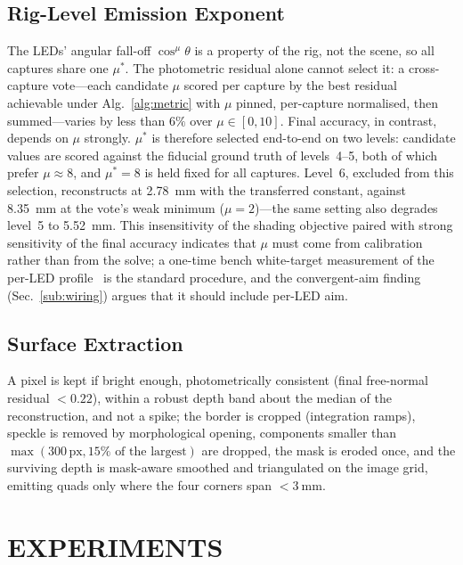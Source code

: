 \documentclass[conference]{IEEEtran}
\begin{document}
\subsection{Rig-Level Emission Exponent}\label{sub:mu}
The LEDs' angular fall-off $\cos^\mu\theta$ is a property of the rig, not
the scene, so all captures share one $\mu^\ast$.  The photometric
residual alone cannot select it: a cross-capture vote---each candidate
$\mu$ scored per capture by the best residual achievable under
Alg.~\ref{alg:metric} with $\mu$ pinned, per-capture normalised, then
summed---varies by less than $6\%$ over $\mu\in[0,10]$.  Final accuracy,
in contrast, depends on $\mu$ strongly.  $\mu^\ast$ is therefore selected
end-to-end on two levels: candidate values are scored against the
fiducial ground truth of levels~4--5, both of which prefer
$\mu\approx8$, and $\mu^\ast=8$ is held fixed for all captures.
Level~6, excluded from this selection, reconstructs at
\SI{2.78}{\milli\meter} with the transferred constant, against
\SI{8.35}{\milli\meter} at the vote's weak minimum ($\mu=2$)---the same
setting also degrades level~5 to \SI{5.52}{\milli\meter}.  This
insensitivity of the shading objective paired with strong sensitivity of
the final accuracy indicates that $\mu$ must come from calibration rather
than from the solve; a one-time bench white-target measurement of the
per-LED profile~\cite{queau2018led,park2014nonisotropic,modrzejewski2020light}
is the standard procedure, and the convergent-aim finding
(Sec.~\ref{sub:wiring}) argues that it should include per-LED aim.

\subsection{Surface Extraction}\label{sub:surf}
A pixel is kept if bright enough, photometrically consistent (final
free-normal residual $<0.22$), within a robust depth band about the
median of the reconstruction, and not a spike; the border is cropped
(integration ramps), speckle is removed by morphological opening,
components smaller than $\max(300\,\text{px},15\%\text{ of the largest})$
are dropped, the mask is eroded once, and the surviving depth is
mask-aware smoothed and triangulated on the image grid, emitting quads
only where the four corners span $<\SI{3}{\milli\meter}$.

\section{EXPERIMENTS}\label{sec:exp}
\end{document}
